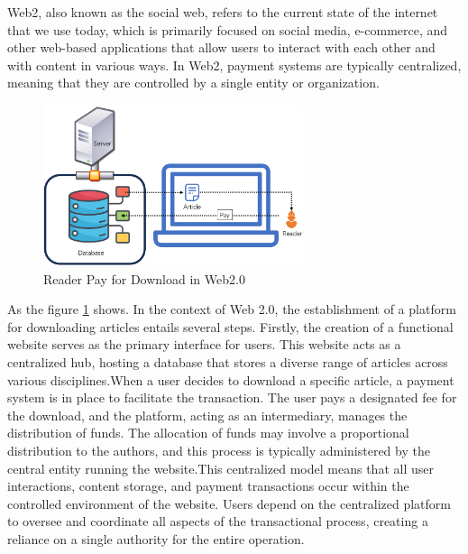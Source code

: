 \documentclass[lettersize,journal]{IEEEtran}
\begin{document}
Web2, also known as the social web, refers to the current state of the internet that we use today, which is primarily focused on social media, e-commerce, and other web-based applications that allow users to interact with each other and with content in various ways. In Web2, payment systems are typically centralized, meaning that they are controlled by a single entity or organization. 

\begin{figure}[h]
  \includegraphics[width=3in]{assets/web2.png}
  \caption{Reader Pay for Download in Web2.0}
  \label{fig:web2}
\end{figure}

As the figure \ref{fig:web2} shows. In the context of Web 2.0, the establishment of a platform for downloading articles entails several steps. Firstly, the creation of a functional website serves as the primary interface for users. This website acts as a centralized hub, hosting a database that stores a diverse range of articles across various disciplines.When a user decides to download a specific article, a payment system is in place to facilitate the transaction. The user pays a designated fee for the download, and the platform, acting as an intermediary, manages the distribution of funds. The allocation of funds may involve a proportional distribution to the authors, and this process is typically administered by the central entity running the website.This centralized model means that all user interactions, content storage, and payment transactions occur within the controlled environment of the website. Users depend on the centralized platform to oversee and coordinate all aspects of the transactional process, creating a reliance on a single authority for the entire operation.
\end{document}

